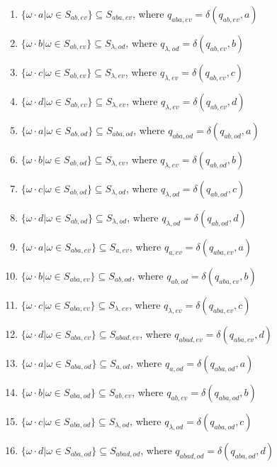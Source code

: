 \documentclass{article}
\begin{document}
\begin{enumerate}
    \item $\{\omega\cdot a|\omega\in S_{ab,ev}\} \subseteq S_{aba,ev}$, where $q_{aba,ev}=\delta(q_{ab,ev},a)$
    \item $\{\omega\cdot b|\omega\in S_{ab,ev}\} \subseteq S_{\lambda,od}$, where $q_{\lambda,od}=\delta(q_{ab,ev},b)$
    \item $\{\omega\cdot c|\omega\in S_{ab,ev}\} \subseteq S_{\lambda,ev}$, where $q_{\lambda,ev}=\delta(q_{ab,ev},c)$
    \item $\{\omega\cdot d|\omega\in S_{ab,ev}\} \subseteq S_{\lambda,ev}$, where $q_{\lambda,ev}=\delta(q_{ab,ev},d)$
    
    \item $\{\omega\cdot a|\omega\in S_{ab,od}\} \subseteq S_{aba,od}$, where $q_{aba,od}=\delta(q_{ab,od},a)$
    \item $\{\omega\cdot b|\omega\in S_{ab,od}\} \subseteq S_{\lambda,ev}$, where $q_{\lambda,ev}=\delta(q_{ab,od},b)$
    \item $\{\omega\cdot c|\omega\in S_{ab,od}\} \subseteq S_{\lambda,od}$, where $q_{\lambda,od}=\delta(q_{ab,od},c)$
    \item $\{\omega\cdot d|\omega\in S_{ab,od}\} \subseteq S_{\lambda,od}$, where $q_{\lambda,od}=\delta(q_{ab,od},d)$
    
    \item $\{\omega\cdot a|\omega\in S_{aba,ev}\} \subseteq S_{a,ev}$, where $q_{a,ev}=\delta(q_{aba,ev},a)$
    \item $\{\omega\cdot b|\omega\in S_{aba,ev}\} \subseteq S_{ab,od}$, where $q_{ab,od}=\delta(q_{aba,ev},b)$
    \item $\{\omega\cdot c|\omega\in S_{aba,ev}\} \subseteq S_{\lambda,ev}$, where $q_{\lambda,ev}=\delta(q_{aba,ev},c)$
    \item $\{\omega\cdot d|\omega\in S_{aba,ev}\} \subseteq S_{abad,ev}$, where $q_{abad,ev}=\delta(q_{aba,ev},d)$
    
    \item $\{\omega\cdot a|\omega\in S_{aba,od}\} \subseteq S_{a,od}$, where $q_{a,od}=\delta(q_{aba,od},a)$
    \item $\{\omega\cdot b|\omega\in S_{aba,od}\} \subseteq S_{ab,ev}$, where $q_{ab,ev}=\delta(q_{aba,od},b)$
    \item $\{\omega\cdot c|\omega\in S_{aba,od}\} \subseteq S_{\lambda,od}$, where $q_{\lambda,od}=\delta(q_{aba,od},c)$
    \item $\{\omega\cdot d|\omega\in S_{aba,od}\} \subseteq S_{abad,od}$, where $q_{abad,od}=\delta(q_{aba,od},d)$
    

\end{enumerate}
\end{document}
